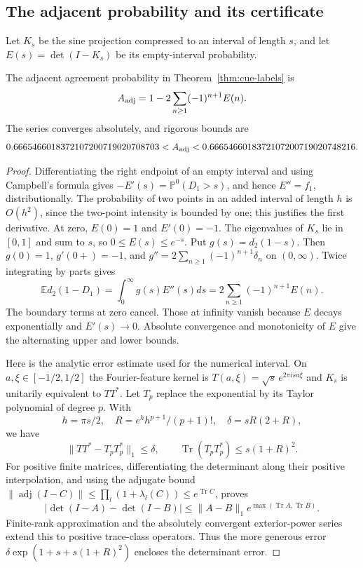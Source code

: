 \subsection{The adjacent probability and its certificate}
Let $K_s$ be the sine projection compressed to an interval of length
$s$, and let $E(s)=\det(I-K_s)$ be its empty-interval probability.

\begin{theorem}\label{thm:cue-agreement}
The adjacent agreement probability in Theorem~\ref{thm:cue-labels} is
\[
 A_{\rm adj}=1-2\sum_{n\ge1}(-1)^{n+1}E(n).
\]
The series converges absolutely, and rigorous bounds are
\[
 0.6665466018372107200719020708703
 <A_{\rm adj}<
 0.6665466018372107200719020748216.
\]
\end{theorem}

\begin{proof}
Differentiating the right endpoint of an empty interval and using
Campbell's formula gives $-E'(s)=\mathbb P^0(D_1>s)$, and hence
$E''=f_1$, distributionally. The probability of two points in an
added interval of length $h$ is $O(h^2)$, since the two-point
intensity is bounded by one; this justifies the first derivative.
At zero, $E(0)=1$ and $E'(0)=-1$. The eigenvalues of $K_s$ lie in
$[0,1]$ and sum to $s$, so $0\le E(s)\le e^{-s}$.
Put $g(s)=d_2(1-s)$. Then $g(0)=1$, $g'(0+)=-1$, and
$g''=2\sum_{n\ge1}(-1)^{n+1}\delta_n$ on $(0,\infty)$.
Twice integrating by parts gives
\[
 \mathbb E d_2(1-D_1)=\int_0^\infty g(s)E''(s)ds
      =2\sum_{n\ge1}(-1)^{n+1}E(n).
\]
The boundary terms at zero cancel. Those at infinity vanish because
$E$ decays exponentially and $E'(s)\to0$. Absolute convergence and
monotonicity of $E$ give the alternating upper and lower bounds.

Here is the analytic error estimate used for the numerical interval.
On $a,\xi\in[-1/2,1/2]$ the Fourier-feature kernel is
$T(a,\xi)=\sqrt s\,e^{2\pi is a\xi}$ and $K_s$ is unitarily
equivalent to $TT^*$. Let $T_p$ replace the exponential by its
Taylor polynomial of degree $p$. With
\[
 h=\pi s/2,\quad R=e^h h^{p+1}/(p+1)!,\quad
 \delta=sR(2+R),
\]
we have
\[
 \|TT^*-T_pT_p^*\|_1\le\delta,
 \qquad \operatorname{Tr}(T_pT_p^*)\le s(1+R)^2.
\]
For positive finite matrices, differentiating the determinant along
their positive interpolation, and using the adjugate bound
$\|\operatorname{adj}(I-C)\|\le\prod_l(1+\lambda_l(C))
\le e^{\operatorname{Tr}C}$, proves
\[
 |\det(I-A)-\det(I-B)|\le\|A-B\|_1
           e^{\max(\operatorname{Tr}A,\operatorname{Tr}B)}.
\]
Finite-rank approximation and the absolutely convergent
exterior-power series extend this to positive trace-class operators.
Thus the more generous error
$\delta\exp(1+s+s(1+R)^2)$ encloses the determinant error.


\end{proof}
